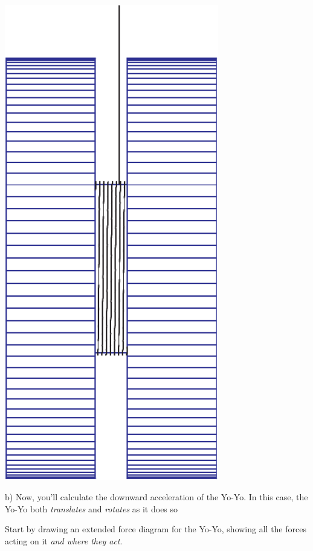 \documentclass[12pt]{article}
\begin{document}
\begin{minipage}{0.20\textwidth}
		\begin{center}
	\includegraphics[width=0.7\textwidth]{blue-crop.pdf}
		\end{center}
\end{minipage}


\vspace{1.5in}

b) Now, you'll calculate the downward acceleration of the Yo-Yo. In this case, the Yo-Yo both {\it translates} and {\it rotates} as it does so

Start by drawing an extended force diagram for the Yo-Yo, showing all the forces acting on it {\it and where they act}.
\end{document}
